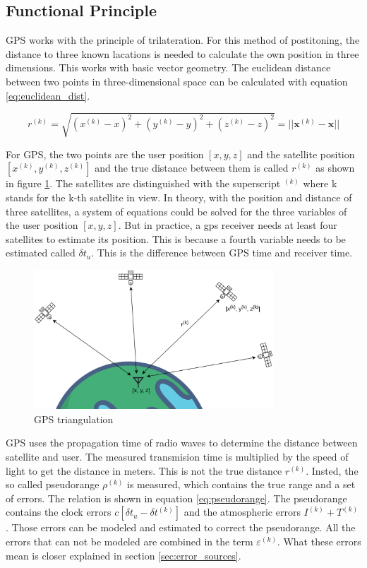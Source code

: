 \subsection{Functional Principle}

GPS works with the principle of trilateration.
For this method of postitoning, the distance to three known lacations is needed to calculate the own position in three dimensions.
This works with basic vector geometry.
The euclidean distance between two points in three-dimensional space can be calculated with equation \ref{eq:euclidean_dist}.

\begin{equation}
 r^{(k)} = \sqrt{(x^{(k)} - x)^2 + (y^{(k)} - y)^2 + (z^{(k)} - z)^2} = \lvert\lvert \textbf{x}^{(k)} - \textbf{x} \rvert\rvert		\label{eq:euclidean_dist}
\end{equation}

For GPS, the two points are the user position $[x, y, z]$ and the satellite position $[x^{(k)}, y^{(k)}, z^{(k)}]$ and the true distance between them is called $r^{(k)}$ as shown in figure \ref{fig:triangulation}.
The satellites are distinguished with the superscript $^{(k)}$ where k stands for the k-th satellite in view.
In theory, with the position and distance of three satellites, a system of equations could be solved for the three variables of the user position $[x, y, z]$.
But in practice, a gps receiver needs at least four satellites to estimate its position.
This is because a fourth variable needs to be estimated called $\delta t_u$.
This is the difference between GPS time and receiver time.

\begin{figure}[ht]
 \centering
 \includegraphics[width=0.8\textwidth]{images/Position_Estimation.png}
 \caption{GPS triangulation}
 \label{fig:triangulation}
\end{figure}

GPS uses the propagation time of radio waves to determine the distance between satellite and user.
The measured transmision time is multiplied by the speed of light to get the distance in meters.
This is not the true distance $r^{(k)}$.
Insted, the so called pseudorange $\rho^{(k)}$ is measured, which contains the true range and a set of errors.
The relation is shown in equation \ref{eq:pseudorange}.
The pseudorange contains the clock errors $c[\delta t_u - \delta t^{(k)}]$ and the atmospheric errors $I^{(k)} + T^{(k)}$.
Those errors can be modeled and estimated to correct the pseudorange.
All the errors that can not be modeled are combined in the term $\varepsilon^{(k)}$.
What these errors mean is closer explained in section \ref{sec:error_sources}.

